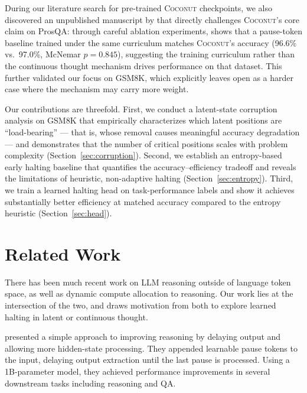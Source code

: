 \documentclass{article}
\begin{document}
During our literature search for pre-trained \textsc{Coconut} checkpoints, we also discovered an unpublished manuscript by \citet{martin2025curriculum} that directly challenges \textsc{Coconut}'s core claim on ProsQA: through careful ablation experiments, \citeauthor{martin2025curriculum} shows that a pause-token baseline trained under the same curriculum matches \textsc{Coconut}'s accuracy (96.6\% vs.\ 97.0\%, McNemar $p = 0.845$), suggesting the training curriculum rather than the continuous thought mechanism drives performance on that dataset. This further validated our focus on GSM8K, which \citet{martin2025curriculum} explicitly leaves open as a harder case where the mechanism may carry more weight.

Our contributions are threefold. First, we conduct a latent-state corruption analysis on GSM8K that empirically characterizes which latent positions are ``load-bearing'' --- that is, whose removal causes meaningful accuracy degradation --- and demonstrates that the number of critical positions scales with problem complexity (Section~\ref{sec:corruption}). Second, we establish an entropy-based early halting baseline that quantifies the accuracy--efficiency tradeoff and reveals the limitations of heuristic, non-adaptive halting (Section~\ref{sec:entropy}). Third, we train a learned halting head on task-performance labels and show it achieves substantially better efficiency at matched accuracy compared to the entropy heuristic (Section~\ref{sec:head}).

\section{Related Work}

There has been much recent work on LLM reasoning outside of language token space, as well as dynamic compute allocation to reasoning. Our work lies at the intersection of the two, and draws motivation from both to explore learned halting in latent or continuous thought.

\citet{pause2024} presented a simple approach to improving reasoning by delaying output and allowing more hidden-state processing. They appended learnable pause tokens to the input, delaying output extraction until the last pause is processed. Using a 1B-parameter model, they achieved performance improvements in several downstream tasks including reasoning and QA.
\end{document}
